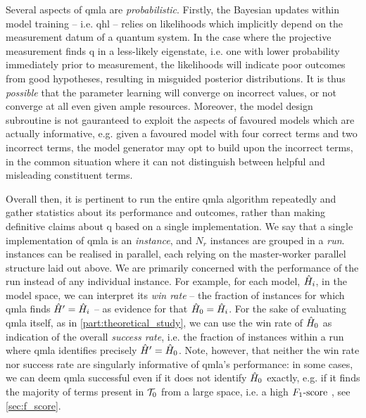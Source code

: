 Several aspects of \gls{qmla} are \emph{probabilistic}.
Firstly, the Bayesian updates within model training -- i.e. \gls{qhl} --
    relies on \glspl{likelihood} which 
    implicitly depend on the measurement datum of a quantum system.
In the case where the projective measurement finds \gls{q} in a less-likely eigenstate, 
    i.e. one with lower probability immediately prior to measurement, 
    the \glspl{likelihood}  will indicate poor outcomes from good hypotheses, 
    resulting in misguided posterior distributions. 
It is thus \emph{possible} that the parameter learning will converge on incorrect values,
    or not converge at all even given ample resources. 
Moreover, the model design subroutine is not gauranteed to exploit the aspects of favoured models which are 
    actually informative, e.g. given a favoured model with four correct terms and two incorrect terms, 
    the model generator may opt to build upon the incorrect terms, in the common situation where it can not distinguish between 
    helpful and misleading constituent terms.
\par 

Overall then, 
    it is pertinent to run the entire \gls{qmla} algorithm repeatedly and gather statistics about its performance and outcomes, 
    rather than making definitive claims about \gls{q} based on a single implementation.
We say that a single implementation of \gls{qmla} is an \emph{\gls{instance}},
    and $N_r$ \glspl{instance} are grouped in a \emph{\gls{run}}.
\Glspl{instance} can be realised in parallel, 
    each relying on the master-worker parallel structure laid out above. 
We are primarily concerned with the performance of the \gls{run} 
    instead of any individual instance. 
For example,
    for each model, $\hat{H}_i$, in the \gls{model space}, we can interpret its \emph{ \gls{win rate} } 
    -- the fraction of instances for which \gls{qmla} finds $\hat{H}^{\prime}=\hat{H}_i$ -- 
    as evidence for that $\hat{H}_0=\hat{H}_i$.
For the sake of evaluating \gls{qmla} itself, as in \cref{part:theoretical_study}, 
    we can use the  \gls{win rate}  of $\hat{H}_0$ as indication of the overall \emph{\gls{success rate}}, 
    i.e. the fraction of \glspl{instance} within a run where \gls{qmla} identifies precisely $\hat{H}^{\prime} = \hat{H}_0$. 
Note, however, that neither the  \gls{win rate}  nor \gls{success rate} are singularly informative 
    of \gls{qmla}'s performance: in some cases, we can deem \gls{qmla} successful even if it does not 
    identify $\hat{H}_0$ exactly, e.g. if it finds the majority of terms present in $\mathcal{T}_0$ from a large space, 
    i.e. a high $ F_{1}\text{-score}  \ $, see \cref{sec:f_score}. 
\par 

